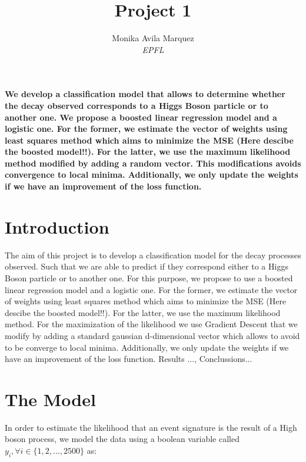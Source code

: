 \documentclass[10pt,conference,compsocconf]{IEEEtran}
\begin{document}
\title{Project 1}

\author{
  Monika Avila Marquez \\
  \textit{EPFL}
}

\maketitle

\begin{abstract}
  
\end{abstract}	\textbf{We develop a classification model that allows to determine whether the decay observed corresponds to a Higgs Boson particle or to another one. We propose a boosted linear regression model and a logistic one. For the former, we estimate the vector of weights using least squares method which aims to minimize the MSE (Here descibe the boosted model!!). For the latter, we use the maximum likelihood method modified by adding a random vector. This modifications avoids convergence to local minima. Additionally, we only update the weights if we have an improvement of the loss function. }

\section{Introduction}

The aim of this project is to develop a classification model for the decay processes observed. Such that we are able to predict if they correspond either to a Higgs Boson particle or to another one. For this purpose, we propose to use a  boosted linear regression model and a logistic one. For the former, we estimate the vector of weights using least squares method which aims to minimize the MSE (Here descibe the boosted model!!). For the latter, we use the maximum likelihood method. For the maximization of the likelihood we use Gradient Descent that we modify by adding a standard gaussian d-dimensional vector which allows to avoid to be converge to local minima. Additionally, we only update the weights if we have an improvement of the loss function.
Results ..., Conclussions...
\section{The Model}
\label{S1}
In order to estimate the likelihood that an event signature is the result of a High boson process, we model the data using a boolean variable called $y_i, \forall i \in  \{1, 2, ..., 2500\}  $ as:
\end{document}
